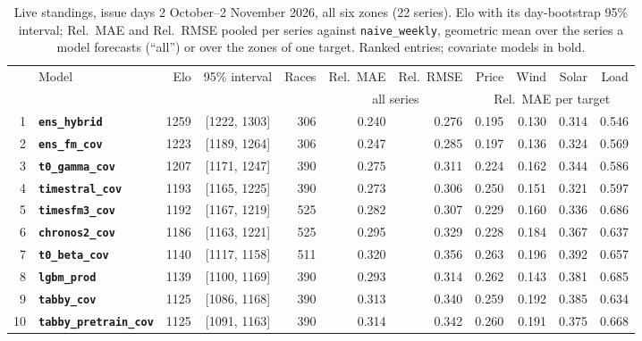 \documentclass[11pt,a4paper]{article}
\newcommand{\m}[1]{\texttt{#1}}
\begin{document}
\begin{table}[!t]
\centering\scriptsize
\setlength{\tabcolsep}{4pt}
\begin{threeparttable}
\caption{Live standings, issue days 2 October--2 November 2026, all six zones (22 series). Elo with its day-bootstrap 95\%
interval; Rel.\ MAE and Rel.\ RMSE pooled per series against \m{naive\_weekly}, geometric mean over the series a model
forecasts (``all'') or over the zones of one target. Ranked entries; covariate models in bold.}
\label{tab:live}
\begin{tabular}{@{}rlrcrrrrrrr@{}}
\toprule
& Model & Elo & 95\% interval & Races & Rel.\ MAE & Rel.\ RMSE & Price & Wind & Solar & Load \\
\cmidrule(lr){6-7}\cmidrule(l){8-11}
& & & & & \multicolumn{2}{c}{all series} & \multicolumn{4}{c}{Rel.\ MAE per target} \\
\midrule
    1 & \texttt{\textbf{ens\_hybrid}} & 1259 & [1222, 1303] & 306 & 0.240 & 0.276 & 0.195 & 0.130 & 0.314 & 0.546 \\
    2 & \texttt{\textbf{ens\_fm\_cov}} & 1223 & [1189, 1264] & 306 & 0.247 & 0.285 & 0.197 & 0.136 & 0.324 & 0.569 \\
    3 & \texttt{\textbf{t0\_gamma\_cov}} & 1207 & [1171, 1247] & 390 & 0.275 & 0.311 & 0.224 & 0.162 & 0.344 & 0.586 \\
    4 & \texttt{\textbf{timestral\_cov}} & 1193 & [1165, 1225] & 390 & 0.273 & 0.306 & 0.250 & 0.151 & 0.321 & 0.597 \\
    5 & \texttt{\textbf{timesfm3\_cov}} & 1192 & [1167, 1219] & 525 & 0.282 & 0.307 & 0.229 & 0.160 & 0.336 & 0.686 \\
    6 & \texttt{\textbf{chronos2\_cov}} & 1186 & [1163, 1221] & 525 & 0.295 & 0.329 & 0.228 & 0.184 & 0.367 & 0.637 \\
    7 & \texttt{\textbf{t0\_beta\_cov}} & 1140 & [1117, 1158] & 511 & 0.320 & 0.356 & 0.263 & 0.196 & 0.392 & 0.657 \\
    8 & \texttt{\textbf{lgbm\_prod}} & 1139 & [1100, 1169] & 390 & 0.293 & 0.314 & 0.262 & 0.143 & 0.381 & 0.685 \\
    9 & \texttt{\textbf{tabby\_cov}} & 1125 & [1086, 1168] & 390 & 0.313 & 0.340 & 0.259 & 0.192 & 0.385 & 0.634 \\
    10 & \texttt{\textbf{tabby\_pretrain\_cov}} & 1125 & [1091, 1163] & 390 & 0.314 & 0.342 & 0.260 & 0.191 & 0.375 & 0.668 \\

\end{tabular}
\end{threeparttable}
\end{table}
\end{document}
